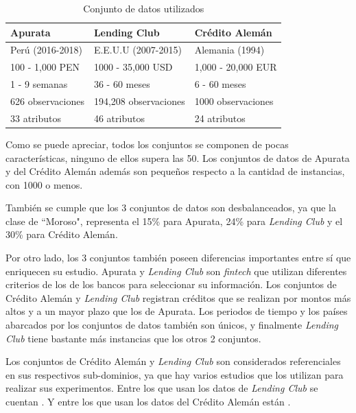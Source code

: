 \begin{table}
	\centering
	\caption{Conjunto de datos utilizados}
	\label{tab:dataset-comparison}
	\begin{tabular}{@{}lll@{}}
	\toprule
	\textbf{Apurata}	& \textbf{Lending Club}		& \textbf{Crédito Alemán}	\\
	\midrule
	Perú (2016-2018)	& E.E.U.U (2007-2015)		& Alemania (1994)			\\
	100 - 1,000 PEN		& 1000 - 35,000 USD			& 1,000 - 20,000 EUR		\\
	1 - 9 semanas		& 36 - 60 meses				& 6 - 60 meses				\\
	626 observaciones	& 194,208 observaciones		& 1000 observaciones		\\
	33 atributos		& 46 atributos				& 24 atributos				\\
	\bottomrule
	\end{tabular}
\end{table}

Como se puede apreciar, todos los conjuntos se componen de pocas características, ninguno de ellos supera las 50. Los conjuntos de datos de Apurata y del Crédito Alemán además son pequeños respecto a la cantidad de instancias, con 1000 o menos.

También se cumple que los 3 conjuntos de datos son desbalanceados, ya que la clase de ``Moroso", representa el 15\% para Apurata, 24\% para \textit{Lending Club} y el 30\% para Crédito Alemán.

Por otro lado, los 3 conjuntos también poseen diferencias importantes entre sí que enriquecen su estudio. Apurata y \textit{Lending Club} son \textit{fintech} que utilizan diferentes criterios de los de los bancos para seleccionar su información. Los conjuntos de Crédito Alemán y \textit{Lending Club} registran créditos que se realizan por montos más altos y a un mayor plazo que los de Apurata. Los periodos de tiempo y los países abarcados por los conjuntos de datos también son únicos, y finalmente \textit{Lending Club} tiene bastante más instancias que los otros 2 conjuntos.

Los conjuntos de Crédito Alemán y \textit{Lending Club} son considerados referenciales en sus respectivos sub-dominios, ya que hay varios estudios que los utilizan para realizar sus experimentos. Entre los que usan los datos de \textit{Lending Club} se cuentan \citep{malekipirbazari2015risk, zhang2016research, zang2014credit, tan2018deep}. Y entre los que usan los datos del Crédito Alemán están \citep{harris2015credit, nanni2009experimental, brown2012experimental, wang2012two}.

